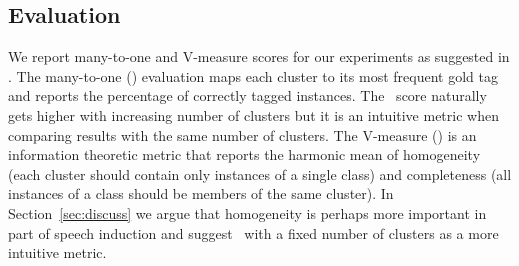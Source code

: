 
\subsection{Evaluation}

We report many-to-one and V-measure scores for our experiments as
suggested in \cite{Christodoulopoulos:2010:TDU:1870658.1870714}.  The
many-to-one (\mto) evaluation maps each cluster to its most frequent
gold tag and reports the percentage of correctly tagged instances.
The \mto\ score naturally gets higher with increasing number of
clusters but it is an intuitive metric when comparing results with the
same number of clusters.  The V-measure (\vm) \cite{rosenberg2007v} is
an information theoretic metric that reports the harmonic mean of
homogeneity (each cluster should contain only instances of a single
class) and completeness (all instances of a class should be members of
the same cluster).  In Section~\ref{sec:discuss} we argue that
homogeneity is perhaps more important in part of speech induction and
suggest \mto\ with a fixed number of clusters as a more intuitive
metric.

